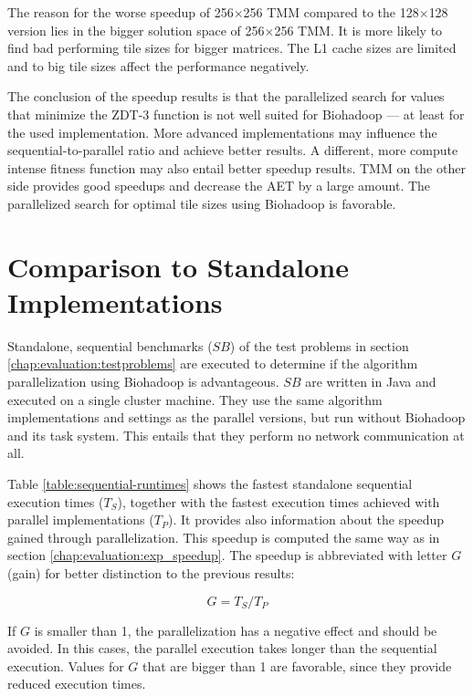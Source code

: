 The reason for the worse speedup of 256$\times$256 TMM compared to the 128$\times$128 version lies in the bigger solution space of 256$\times$256 TMM. It is more likely to find bad performing tile sizes for bigger matrices. The L1 cache sizes are limited and to big tile sizes affect the performance negatively.

The conclusion of the speedup results is that the parallelized search for values that minimize the ZDT-3 function is not well suited for Biohadoop --- at least for the used implementation. More advanced implementations may influence the sequential-to-parallel ratio and achieve better results. A different, more compute intense fitness function may also entail better speedup results. TMM on the other side provides good speedups and decrease the AET by a large amount. The parallelized search for optimal tile sizes using Biohadoop is favorable.

\section{Comparison to Standalone Implementations}
\label{chap:evaluation:comparison}
Standalone, sequential benchmarks ($SB$) of the test problems in section \ref{chap:evaluation:testproblems} are executed to determine if the algorithm parallelization using Biohadoop is advantageous. $SB$ are written in Java and executed on a single cluster machine. They use the same algorithm implementations and settings as the parallel versions, but run without Biohadoop and its task system. This entails that they perform no network communication at all.

Table \ref{table:sequential-runtimes} shows the fastest standalone sequential execution times ($T_S$), together with the fastest execution times achieved with parallel implementations ($T_P$). It provides also information about the speedup gained through parallelization. This speedup is computed the same way as in section \ref{chap:evaluation:exp_speedup}. The speedup is abbreviated with letter $G$ (gain) for better distinction to the previous results:

\begin{equation}
G = T_S / T_P 
\end{equation}

If $G$ is smaller than 1, the parallelization has a negative effect and should be avoided. In this cases, the parallel execution takes longer than the sequential execution. Values for $G$ that are bigger than 1 are favorable, since they provide reduced execution times.

